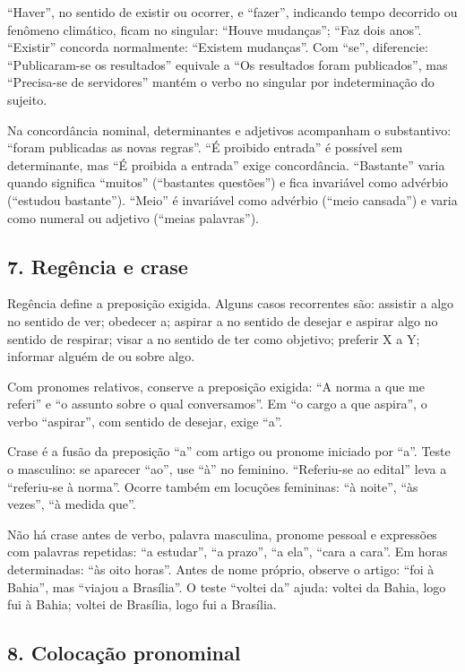 \documentclass[11pt,a4paper]{article}
\begin{document}
“Haver”, no sentido de existir ou ocorrer, e “fazer”, indicando tempo decorrido ou fenômeno climático, ficam no singular: “Houve mudanças”; “Faz dois anos”. “Existir” concorda normalmente: “Existem mudanças”. Com “se”, diferencie: “Publicaram-se os resultados” equivale a “Os resultados foram publicados”, mas “Precisa-se de servidores” mantém o verbo no singular por indeterminação do sujeito.

Na concordância nominal, determinantes e adjetivos acompanham o substantivo: “foram publicadas as novas regras”. “É proibido entrada” é possível sem determinante, mas “É proibida a entrada” exige concordância. “Bastante” varia quando significa “muitos” (“bastantes questões”) e fica invariável como advérbio (“estudou bastante”). “Meio” é invariável como advérbio (“meio cansada”) e varia como numeral ou adjetivo (“meias palavras”).

\subsection*{7. Regência e crase}

Regência define a preposição exigida. Alguns casos recorrentes são: assistir a algo no sentido de ver; obedecer a; aspirar a no sentido de desejar e aspirar algo no sentido de respirar; visar a no sentido de ter como objetivo; preferir X a Y; informar alguém de ou sobre algo.

Com pronomes relativos, conserve a preposição exigida: “A norma a que me referi” e “o assunto sobre o qual conversamos”. Em “o cargo a que aspira”, o verbo “aspirar”, com sentido de desejar, exige “a”.

Crase é a fusão da preposição “a” com artigo ou pronome iniciado por “a”. Teste o masculino: se aparecer “ao”, use “à” no feminino. “Referiu-se ao edital” leva a “referiu-se à norma”. Ocorre também em locuções femininas: “à noite”, “às vezes”, “à medida que”.

Não há crase antes de verbo, palavra masculina, pronome pessoal e expressões com palavras repetidas: “a estudar”, “a prazo”, “a ela”, “cara a cara”. Em horas determinadas: “às oito horas”. Antes de nome próprio, observe o artigo: “foi à Bahia”, mas “viajou a Brasília”. O teste “voltei da” ajuda: voltei da Bahia, logo fui à Bahia; voltei de Brasília, logo fui a Brasília.

\subsection*{8. Colocação pronominal}
\end{document}
